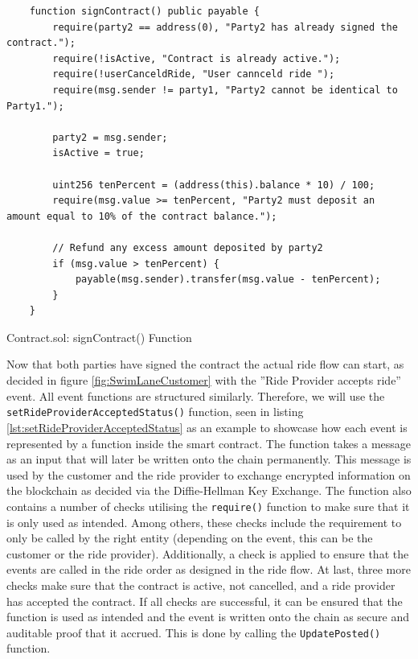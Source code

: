 \begin{Listing}
\begin{lstlisting}
    function signContract() public payable {
        require(party2 == address(0), "Party2 has already signed the contract.");
        require(!isActive, "Contract is already active.");
        require(!userCanceldRide, "User cannceld ride ");
        require(msg.sender != party1, "Party2 cannot be identical to Party1.");
        
        party2 = msg.sender;
        isActive = true;

        uint256 tenPercent = (address(this).balance * 10) / 100;
        require(msg.value >= tenPercent, "Party2 must deposit an amount equal to 10% of the contract balance.");

        // Refund any excess amount deposited by party2
        if (msg.value > tenPercent) {
            payable(msg.sender).transfer(msg.value - tenPercent);
        }
    }
\end{lstlisting}
  \caption{Contract.sol: signContract() Function}
  \label{lst:signContract}
\end{Listing}

Now that both parties have signed the contract the actual ride flow can start, as decided in figure \ref{fig:SwimLaneCustomer} with the ''Ride Provider accepts ride'' event. All event functions are structured similarly. Therefore, we will use the \texttt{setRideProviderAcceptedStatus()} function, seen in listing \ref{lst:setRideProviderAcceptedStatus} as an example to showcase how each event is represented by a function inside the smart contract. The function takes a message as an input that will later be written onto the chain permanently. This message is used by the customer and the ride provider to exchange encrypted information on the blockchain as decided via the Diffie-Hellman Key Exchange. The function also contains a number of checks utilising the \texttt{require()} function to make sure that it is only used as intended. Among others, these checks include the requirement to only be called by the right entity (depending on the event, this can be the customer or the ride provider). Additionally, a check is applied to ensure that the events are called in the ride order as designed in the ride flow. At last, three more checks make sure that the contract is active, not cancelled, and a ride provider has accepted the contract. If all checks are successful, it can be ensured that the function is used as intended and the event is written onto the chain as secure and auditable proof that it accrued. This is done by calling the \texttt{UpdatePosted()} function.

